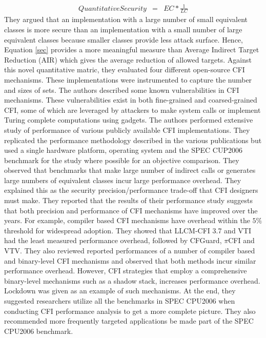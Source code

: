 \documentclass[dvips,12pt]{article}
\begin{document}
\begin{eqnarray}
QuantitativeSecurity &=& EC * \frac{1}{LC}
\label{sec}
\end{eqnarray}
\nolinebreak
They argued that an implementation with a large number of small equivalent classes is more secure than an implementation with a small number of large equivalent classes because smaller classes provide less attack surface. Hence, Equation \ref{sec} provides a more meaningful measure than Average Indirect Target Reduction (AIR) which gives the average reduction of allowed targets. Against this novel quantitative matric, they evaluated four different open-source CFI mechanisms. These implementations were instrumented to capture the number and sizes of sets. The authors described some known vulnerabilities in CFI mechanisms. These vulnerabilities exist in both fine-grained and coarsed-grained CFI, some of which are leveraged by attackers to make system calls or implement Turing complete computations using gadgets.
\newline
\newline
The authors performed extensive study of performance of various publicly available CFI implementations. They replicated the performance methodology described in the various publications but used a single hardware platform, operating system and the SPEC CUP2006 benchmark for the study where possible for an objective comparison. They observed that benchmarks that make large number of indirect calls or generates large numbers of equivalent classes incur large performance overhead. They explained this as the security precision/performance trade-off that CFI designers must make. They reported that the results of their performance study suggests that both precision and performance of CFI mechanisms have improved over the years. For example, compiler based CFI mechanisms have overhead within the $5\%$ threshold for widespread adoption. They showed that LLCM-CFI 3.7 and VTI had the least measured performance overhead, followed by CFGuard, $\pi$CFI and VTV. They also reviewed reported performances of a number of compiler based and binary-level CFI mechanisms and observed that both methods incur similar performance overhead. However, CFI strategies that employ a comprehensive binary-level mechanisms such as a shadow stack, increases performance overhead. Lockdown was given as an example of such mechanisms. At the end, they suggested researchers utilize all the benchmarks in SPEC CPU2006 when conducting CFI performance analysis to get a more complete picture. They also recommended more frequently targeted applications be made part of the SPEC CPU2006 benchmark.  
\end{document}
